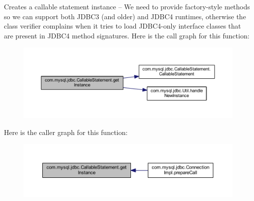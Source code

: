 Creates a callable statement instance -- We need to provide factory-\/style methods so we can support both J\+D\+B\+C3 (and older) and J\+D\+B\+C4 runtimes, otherwise the class verifier complains when it tries to load J\+D\+B\+C4-\/only interface classes that are present in J\+D\+B\+C4 method signatures. Here is the call graph for this function\+:\nopagebreak
\begin{figure}[H]
\begin{center}
\leavevmode
\includegraphics[width=350pt]{classcom_1_1mysql_1_1jdbc_1_1_callable_statement_a48501c01025bf2330e0dc26b7e43947e_cgraph}
\end{center}
\end{figure}
Here is the caller graph for this function\+:\nopagebreak
\begin{figure}[H]
\begin{center}
\leavevmode
\includegraphics[width=350pt]{classcom_1_1mysql_1_1jdbc_1_1_callable_statement_a48501c01025bf2330e0dc26b7e43947e_icgraph}
\end{center}
\end{figure}
\mbox{\label{classcom_1_1mysql_1_1jdbc_1_1_callable_statement_a1333dd5bd813e16fd179c31927c46c83}} 
